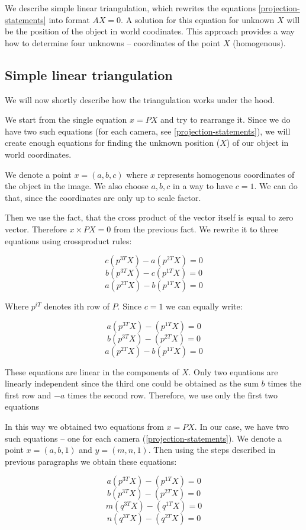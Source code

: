 We describe simple linear triangulation, which rewrites the equations
\ref{projection-statements} into format $AX = 0$. A solution for this equation
for unknown $X$ will be the position of the object in world coodinates. This
approach provides a way how to determine four unknowns -- coordinates
of the point $X$ (homogenous).


\subsection{Simple linear triangulation}

We will now shortly describe how the triangulation works under the hood.

We start from the single equation $x = PX$ and try to rearrange it. Since we do
have two such equations (for each camera, see \ref{projection-statements}), we
will create enough equations for finding the unknown position ($X$) of our
object in world coordinates.

We denote a point $x=(a, b, c)$ where $x$ represents homogenous coordinates of
the object in the image. We also choose $a, b, c$ in a way to have $c = 1$. We
can do that, since the coordinates are only up to scale factor.

Then we use the fact, that the cross product of the vector itself is equal to
zero vector. Therefore $x \times PX = 0$ from the previous fact. We rewrite it
to three equations using crossproduct rules:

$$ c(p^{3T}X) - a(p^{2T}X) = 0 $$
$$ b(p^{3T}X) - c(p^{1T}X) = 0 $$
$$ a(p^{2T}X) - b(p^{1T}X) = 0 $$

Where $p^{iT}$ denotes ith row of $P$. Since $c = 1$ we can equally write:

$$ a(p^{3T}X) - (p^{1T}X) = 0 $$
$$ b(p^{3T}X) - (p^{2T}X) = 0 $$
$$ a(p^{2T}X) - b(p^{1T}X) = 0 $$

These equations are linear in the components of $X$. Only two equations are
linearly independent since the third one could be obtained as the sum $b$ times
the first row and $-a$ times the second row. Therefore, we use only the first
two equations

In this way we obtained two equations from $x = PX$. In our case, we have
two such equations -- one for each camera (\ref{projection-statements}). We
denote a point $x = (a, b, 1)$ and $y=(m, n, 1)$. Then using the steps described in previous paragraphs we obtain these equations:

$$ a(p^{3T}X) - (p^{1T}X) = 0 $$
$$ b(p^{3T}X) - (p^{2T}X) = 0 $$
$$ m(q^{3T}X) - (q^{1T}X) = 0 $$
$$ n(q^{3T}X) - (q^{2T}X) = 0 $$


